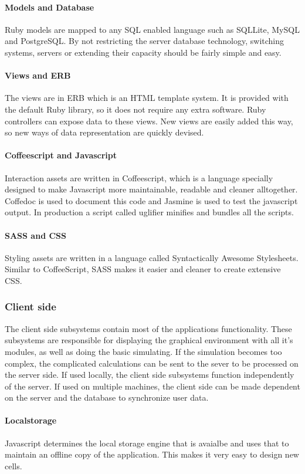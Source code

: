 \documentclass{report}
\begin{document}
				\paragraph{Models and Database}
					Ruby models are mapped to any SQL enabled language such as SQLLite, MySQL and PostgreSQL. By not restricting the server database technology, switching systems, servers or extending  their capacity should be fairly simple and easy.
				\paragraph{Views and ERB}
					The views are in ERB which is an HTML template system. It is provided with the default Ruby library, so it does not require any extra software. Ruby controllers can expose data to these views. New views are easily added this way, so new ways of data representation are quickly devised.
				\paragraph{Coffeescript and Javascript}
					Interaction assets are written in Coffeescript, which is a language specially designed to make Javascript more maintainable, readable and cleaner alltogether. Coffedoc is used to document this code and Jasmine is used to test the javascript output. In production a script called uglifier minifies and bundles all the scripts.
				\paragraph{SASS and CSS}
					Styling assets are written in a language called Syntactically Awesome Stylesheets. Similar to CoffeeScript, SASS makes it easier and cleaner to create extensive CSS. 
			\subsubsection{Client side}
				The client side subsystems contain most of the applications functionality. These subsystems are responsible for displaying the graphical environment with all it's modules, as well as doing the basic simulating. If the simulation becomes too complex, the complicated calculations can be sent to the sever to be processed on the server side. If used locally, the client side subsystems function independently of the server. If used on multiple machines, the client side can be made dependent on the server and the database to synchronize user data.
				\paragraph{Localstorage}
					Javascript determines the local storage engine that is avaialbe and uses that to maintain an offline copy of the application. This makes it very easy to design new cells. 
\end{document}
